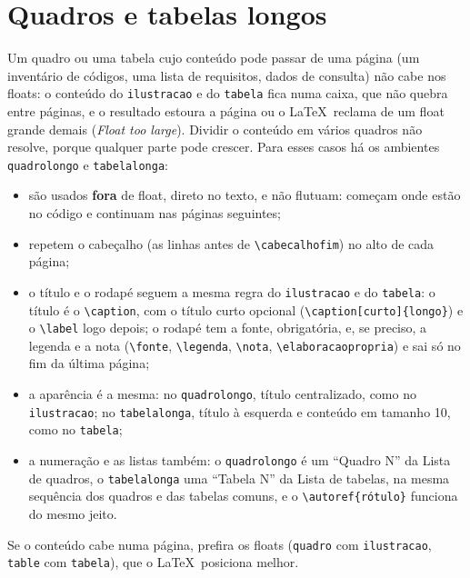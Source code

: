 
\section{Quadros e tabelas longos}\label{sec:longos}

Um quadro ou uma tabela cujo conteúdo pode passar de uma página (um inventário de códigos,
uma lista de requisitos, dados de consulta) não cabe nos floats: o conteúdo do
\texttt{ilustracao} e do \texttt{tabela} fica numa caixa, que não quebra entre páginas, e o
resultado estoura a página ou o \LaTeX\ reclama de um float grande demais (\emph{Float too
large}). Dividir o conteúdo em vários quadros não resolve, porque qualquer parte pode
crescer. Para esses casos há os ambientes \texttt{quadrolongo} e \texttt{tabelalonga}:
\begin{itemize}
  \item são usados \textbf{fora} de float, direto no texto, e não flutuam: começam onde
        estão no código e continuam nas páginas seguintes;
  \item repetem o cabeçalho (as linhas antes de \texttt{\textbackslash cabecalhofim}) no
        alto de cada página;
  \item o título e o rodapé seguem a mesma regra do \texttt{ilustracao} e do
        \texttt{tabela}: o título é o \texttt{\textbackslash caption}, com o título curto
        opcional (\texttt{\textbackslash caption[curto]\{longo\}}) e o
        \texttt{\textbackslash label} logo depois; o rodapé tem a fonte, obrigatória, e, se
        preciso, a legenda e a nota (\texttt{\textbackslash fonte},
        \texttt{\textbackslash legenda}, \texttt{\textbackslash nota},
        \texttt{\textbackslash elaboracaopropria}) e sai só no fim da última página;
  \item a aparência é a mesma: no \texttt{quadrolongo}, título centralizado, como no
        \texttt{ilustracao}; no \texttt{tabelalonga}, título à esquerda e conteúdo em
        tamanho 10, como no \texttt{tabela};
  \item a numeração e as listas também: o \texttt{quadrolongo} é um ``Quadro N'' da Lista
        de quadros, o \texttt{tabelalonga} uma ``Tabela N'' da Lista de tabelas, na mesma
        sequência dos quadros e das tabelas comuns, e o
        \texttt{\textbackslash autoref\{rótulo\}} funciona do mesmo jeito.
\end{itemize}
Se o conteúdo cabe numa página, prefira os floats (\texttt{quadro} com
\texttt{ilustracao}, \texttt{table} com \texttt{tabela}), que o \LaTeX\ posiciona melhor.


